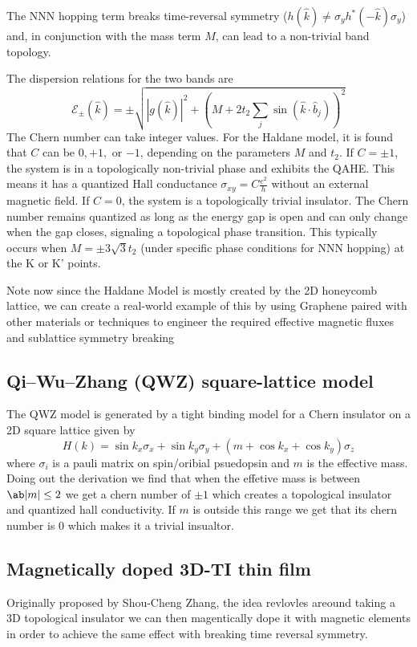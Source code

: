 \documentclass[aps,prb,twocolumn]{revtex4-2}
\begin{document}
      The NNN hopping term breaks time-reversal symmetry ($h(\hat{k}) \neq \sigma_y h^*(-\hat{k}) \sigma_y$) and, in conjunction with the mass term $M$, can lead to a non-trivial band topology. 
      
      The dispersion relations for the two bands are 
      \[\mathcal{E}_{\pm}(\hat{k}) = \pm \sqrt{|g(\hat{k})|^2 + (M + 2t_2 \sum_j \sin(\hat{k} \cdot \hat{b}_j))^2}\]
      The Chern number can take integer values. For the Haldane model, it is found that $C$ can be $0, +1,$ or $-1$, depending on the parameters $M$ and $t_2$. If $C = \pm 1$, the system is in a topologically non-trivial phase and exhibits the QAHE. This means it has a quantized Hall conductance $\sigma_{xy} = C \frac{e^2}{h}$ without an external magnetic field. If $C = 0$, the system is a topologically trivial insulator.
      The Chern number remains quantized as long as the energy gap is open and can only change when the gap closes, signaling a topological phase transition. This typically occurs when $M = \pm 3\sqrt{3}t_2$ (under specific phase conditions for NNN hopping) at the K or K' points.
      
      Note now since the Haldane Model is mostly created by the 2D honeycomb lattice, we can create a real-world example of this by using Graphene paired with other materials or techniques to engineer the required effective magnetic fluxes and sublattice symmetry breaking 

    \subsection{Qi–Wu–Zhang (QWZ) square-lattice model}
      The QWZ model is generated by a tight binding model for a Chern insulator on a 2D square lattice given by 
      \[H(k)=\sin k_x \sigma_x + \sin k_y \sigma_y + (m+\cos k_x+\cos k_y)\sigma_z\]
      where $\sigma_i$ is a pauli matrix on spin/oribial psuedopsin and $m$ is the effective mass. Doing out the derivation we find that when the effetive mass is between $\ab|m|\le2$ we get a chern number of $\pm1$ which creates a topological insulator and quantized hall conductivity. If $m$ is outside this range we get that its chern number is $0$ which makes it a trivial insualtor.
      
    \subsection{Magnetically doped 3D-TI thin film}
      Originally proposed by Shou-Cheng Zhang\citeauthor{yu_quantized_2010}, the idea revlovles areound taking a 3D topological insulator we can then magentically dope it with magnetic elements in order to achieve the same effect with breaking time reversal symmetry. 
\end{document}
